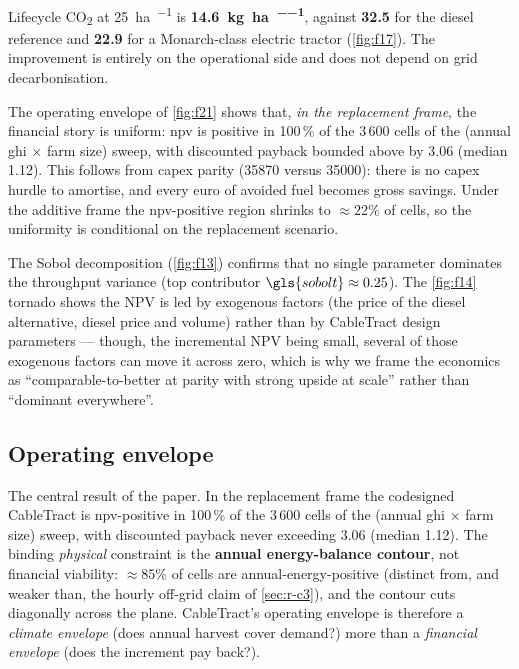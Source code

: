 \documentclass[11pt,a4paper]{article}
\begin{document}
Lifecycle CO\textsubscript{2} at \SI{25}{\hectare\per\year} is \textbf{\SI{14.6}{\kilogram\per\hectare\per\year}}, against \textbf{32.5} for the diesel reference and \textbf{22.9} for a Monarch-class electric tractor (\cref{fig:f17}). The improvement is entirely on the operational side and does not depend on grid decarbonisation.

The operating envelope of \cref{fig:f21} shows that, \emph{in the replacement frame}, the financial story is uniform: \gls{npv} is positive in 100\,\% of the 3\,600 cells of the (annual \gls{ghi} $\times$ farm size) sweep, with discounted payback bounded above by \SI{3.06}{\year} (median \SI{1.12}{\year}). This follows from capex parity (\SI{35870}{\EUR} versus \SI{35000}{\EUR}): there is no capex hurdle to amortise, and every euro of avoided fuel becomes gross savings. Under the additive frame the \gls{npv}-positive region shrinks to ${\approx}22\%$ of cells, so the uniformity is conditional on the replacement scenario.

The Sobol decomposition (\cref{fig:f13}) confirms that no single parameter dominates the throughput variance (top contributor $\gls{sobolt} \approx 0.25$). The \cref{fig:f14} tornado shows the NPV is led by exogenous factors (the price of the diesel alternative, diesel price and volume) rather than by CableTract design parameters --- though, the incremental NPV being small, several of those exogenous factors can move it across zero, which is why we frame the economics as ``comparable-to-better at parity with strong upside at scale'' rather than ``dominant everywhere''.

\subsection{Operating envelope}\label{sec:r-envelope}

The central result of the paper. In the replacement frame the codesigned CableTract is \gls{npv}-positive in 100\,\% of the 3\,600 cells of the (annual \gls{ghi} $\times$ farm size) sweep, with discounted payback never exceeding \SI{3.06}{\year} (median \SI{1.12}{\year}). The binding \emph{physical} constraint is the \textbf{annual energy-balance contour}, not financial viability: ${\approx}85\%$ of cells are annual-energy-positive (distinct from, and weaker than, the hourly off-grid claim of \cref{sec:r-c3}), and the contour cuts diagonally across the plane. CableTract's operating envelope is therefore a \emph{climate envelope} (does annual harvest cover demand?) more than a \emph{financial envelope} (does the increment pay back?).
\end{document}
